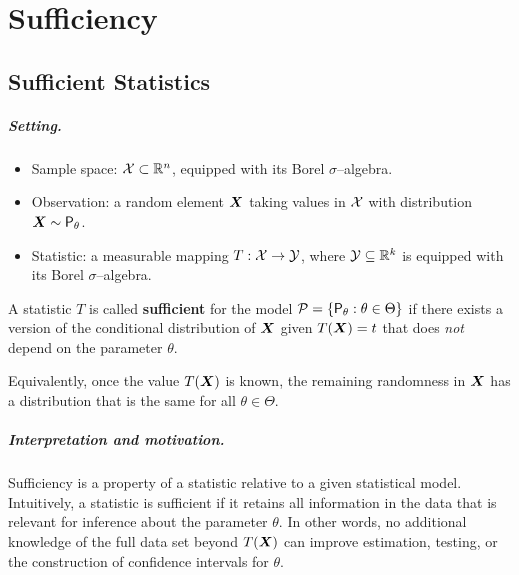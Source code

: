 \chapter{Sufficiency}
\label{cha:Sufficiency}

\section{Sufficient Statistics}%
\label{sec:Sufficient Statistics}

\paragraph{Setting.}
\begin{itemize}
    \item Sample space: $\mathcal{X} \subset \mathbb{R}^{n}$, equipped with its Borel $\sigma$--algebra.
    \item Observation: a random element $\boldsymbol{X}$ taking values in $\mathcal{X}$ with distribution
    $\boldsymbol{X} \sim \mathsf{P}_{\theta}$.
    \item Statistic: a measurable mapping $T : \mathcal{X} \to \mathcal{Y}$, where
    $\mathcal{Y} \subseteq  \mathbb{R}^{k}$ is equipped with its Borel $\sigma$--algebra.
\end{itemize}

\begin{definition}
A statistic $T$ is called \textbf{sufficient} for the model $\mathcal{P} = \{ \mathsf{P}_{\theta} : \theta \in \Theta \}$
if there exists a version of the conditional distribution of $\boldsymbol{X}$ given $T(\boldsymbol{X}) = t$
that does \emph{not} depend on the parameter $\theta$.

Equivalently, once the value $T(\boldsymbol{X})$ is known, the remaining randomness in $\boldsymbol{X}$
has a distribution that is the same for all $\theta \in \Theta$.
\end{definition}

\paragraph{Interpretation and motivation.}
Sufficiency is a property of a statistic relative to a given statistical model.
Intuitively, a statistic is sufficient if it retains all information in the data
that is relevant for inference about the parameter $\theta$.
In other words, no additional knowledge of the full data set beyond $T(\boldsymbol{X})$
can improve estimation, testing, or the construction of confidence intervals for $\theta$.

